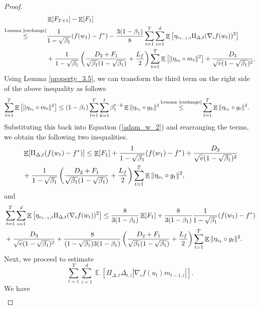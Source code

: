 \documentclass{article} %
\DeclareMathOperator{\Expect}{\mathbb{E}}
\begin{document}
\begin{proof}
\begin{align}
&\Expect[F_{T+1}]-\Expect[F_1]\notag\\\mathop{\le}^{\text{Lemma \ref{exchange}}}&\frac{1}{1-\sqrt{\beta_{1}}}(f(w_1)-f^*)-\frac{3(1-\beta_{1})}{8}\sum_{t=1}^{T}\sum_{i=1}^{d}\Expect\left[\eta_{v_{t-1},i}\Pi_{\Delta,t}(\nabla_{i}f(w_{t}))^{2}\right]\notag\\&+\frac{1}{1-\sqrt{\beta_{1}}}\left(\frac{D_{2}+F_1}{\sqrt{\beta_{1}}(1-\sqrt{\beta_{1}})}+\frac{L_{f}}{2}\right)\sum_{t=1}^{T}\Expect\left[\|\eta_{v_{t}}\circ m_{t}\|^{2}\right]+\frac{D_3}{\sqrt{v}(1-\sqrt{\beta_{1}})^{2}}.  
\end{align}
Using Lemma \ref{property_3.5}, we can transform the third term on the right side of the above inequality as follows
\begin{align*}
 \sum_{t=1}^{T}\Expect\left[\|\eta_{v_{t}}\circ m_{t}\|^{2}\right]&\le  (1-\beta_{1}) \sum_{t=1}^{T} \sum_{k=1}^{t}\beta_{1}^{t-k}\Expect\|\eta_{v_{t}}\circ g_{k}\|^{2}\mathop{\le}^{\text{Lemma \ref{exchange}}}  \sum_{t=1}^{T}\Expect\|\eta_{v_{t}}\circ g_{t}\|^{2}.
\end{align*}
Substituting this back into Equation (\ref{adam_w_2}) and rearranging the terms, we obtain the following two inequalities.
\begin{align}\label{adam_w_2'}
&\Expect[\Pi_{\Delta,t}(f(w_{t})-f^*)]\le \Expect[F_1]+\frac{1}{1-\sqrt{\beta_{1}}}(f(w_1)-f^*)+\frac{D_3}{\sqrt{v}(1-\sqrt{\beta_{1}})^{2}}\notag\\&+\frac{1}{1-\sqrt{\beta_{1}}}\left(\frac{D_{2}+F_1}{\sqrt{\beta_{1}}(1-\sqrt{\beta_{1}})}+\frac{L_{f}}{2}\right)\sum_{t=1}^{T}\Expect\|\eta_{v_{t}}\circ g_{t}\|^{2},  
\end{align}
and
\begin{align}\label{adam_w_2''}
&\sum_{t=1}^{T}\sum_{i=1}^{d}\Expect\left[\eta_{v_{t-1},i}\Pi_{\Delta,t}(\nabla_{i}f(w_{t}))^{2}\right]\le \frac{8}{3(1-\beta_{1})}\Expect[F_1]+\frac{8}{3(1-\beta_{1})}\frac{1}{1-\sqrt{\beta_{1}}}(f(w_1)-f^*)\notag\\&+\frac{D_3}{\sqrt{v}(1-\sqrt{\beta_{1}})^{2}}+\frac{8}{(1-\sqrt{\beta_{1}})3(1-\beta_{1})}\left(\frac{D_{2}+F_1}{\sqrt{\beta_{1}}(1-\sqrt{\beta_{1}})}+\frac{L_{f}}{2}\right)\sum_{t=1}^{T}\Expect\|\eta_{v_{t}}\circ g_{t}\|^{2}. 
\end{align}
Next, we proceed to estimate 
\[\sum_{t=1}^{T}\sum_{i=1}^{d}\Expect\left[\Pi_{\Delta,t}\Delta_{t,i}|\nabla_{i} f(u_{t})m_{t-1,i}|\right]. \] 
We have
\begin{align*}

\end{align*}
\end{proof}
\end{document}
